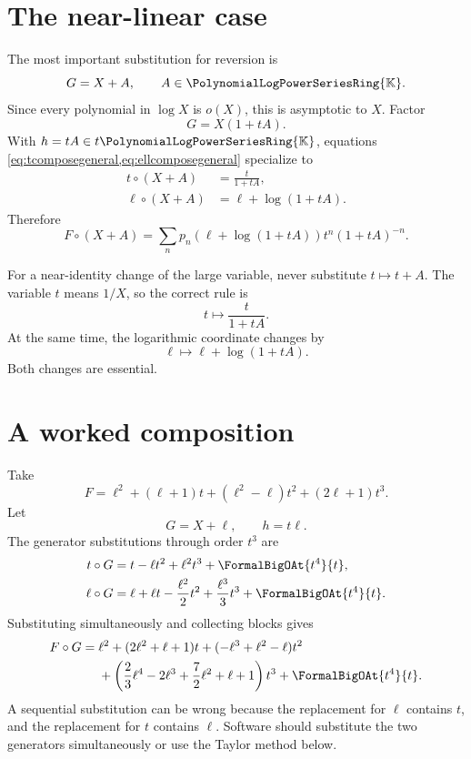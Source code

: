\documentclass[11pt,oneside,openany]{book}
\newcommand{\K}{\mathbb{K}}
\newcommand{\Rring}{\PolynomialLogPowerSeriesRing{\K}}
\newcommand{\compose}{\mathbin{\circ}}
\begin{document}
\section{The near-linear case}
The most important substitution for reversion is
\begin{equation}\label{eq:nearlinearG}
  G=X+A,
  \qquad A\in\Rring.
\end{equation}
Since every polynomial in \(\log X\) is \(o(X)\), this is asymptotic to \(X\).
Factor
\[
 G=X(1+tA).
\]
With \(h=tA\in t\Rring\), equations
\cref{eq:tcomposegeneral,eq:ellcomposegeneral} specialize to
\begin{align}
 t\compose(X+A)&=\frac{t}{1+tA},
 \label{eq:tcomposeshift}\\
 \ell\compose(X+A)&=\ell+\log(1+tA).
 \label{eq:ellcomposeshift}
\end{align}
Therefore
\begin{equation}\label{eq:shiftcompositionexplicit}
 F\compose(X+A)
 =\sum_n p_n\!\left(\ell+\log(1+tA)\right)
   t^n(1+tA)^{-n}.
\end{equation}

\begin{keybox}
For a near-identity change of the large variable, never substitute
\(t\mapsto t+A\).  The variable \(t\) means \(1/X\), so the correct rule is
\[
  t\mapsto\frac{t}{1+tA}.
\]
At the same time, the logarithmic coordinate changes by
\[
  \ell\mapsto\ell+\log(1+tA).
\]
Both changes are essential.
\end{keybox}

\section{A worked composition}
Take
\begin{equation}\label{eq:Fcompositionexample}
 F=\ell^2+(\ell+1)t+(\ell^2-\ell)t^2+(2\ell+1)t^3.
\end{equation}
Let
\[
 G=X+\ell,
 \qquad h=t\ell.
\]
The generator substitutions through order \(t^3\) are
\begin{align*}
 t\compose G
 &=t-\ell t^2+\ell^2t^3+\FormalBigOAt{t^4}{t},\\
 \ell\compose G
 &=\ell+\ell t-\frac{\ell^2}{2}t^2
   +\frac{\ell^3}{3}t^3+\FormalBigOAt{t^4}{t}.
\end{align*}
Substituting simultaneously and collecting blocks gives
\begin{align}\label{eq:compositionworked}
 F\compose G
 ={}&\ell^2+(2\ell^2+\ell+1)t
   +(-\ell^3+\ell^2-\ell)t^2\notag\\
 &+\left(
   \frac23\ell^4-2\ell^3+\frac72\ell^2+\ell+1
   \right)t^3+\FormalBigOAt{t^4}{t}.
\end{align}
A sequential substitution can be wrong because the replacement for \(\ell\)
contains \(t\), and the replacement for \(t\) contains \(\ell\).  Software
should substitute the two generators simultaneously or use the Taylor method
below.
\end{document}
